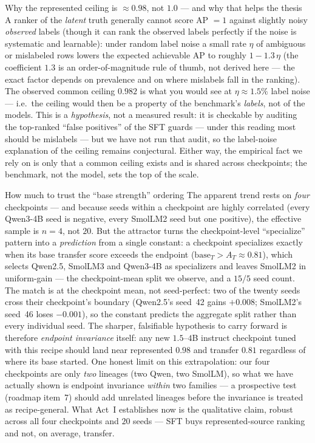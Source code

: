 \begin{background}{Why the represented ceiling is $\approx0.98$, not $1.0$ --- and why that helps the thesis}
A ranker of the \emph{latent} truth generally cannot score AP $=1$ against slightly noisy \emph{observed}
labels (though it can rank the observed labels perfectly if the noise is systematic and learnable): under
random label noise a small rate $\eta$ of ambiguous or mislabeled rows lowers the expected achievable AP to
roughly $1-1.3\,\eta$ (the coefficient
$1.3$ is an order-of-magnitude rule of thumb, not derived here --- the exact factor depends on prevalence
and on where mislabels fall in the ranking). The observed common
ceiling $0.982$ is what you would see at $\eta\approx1.5\%$ label noise --- i.e.\ the ceiling would then be a
property of the benchmark's \emph{labels}, not of the models. This is a \emph{hypothesis}, not a measured
result: it is checkable by auditing the top-ranked ``false positives'' of the SFT guards --- under this
reading most should be mislabels --- but we have not run that audit, so the label-noise explanation of the
ceiling remains conjectural. Either way, the empirical fact we rely on is only that a common ceiling exists
and is shared across checkpoints; the benchmark, not the model, sets the top of the scale.
\end{background}

\begin{takeaway}{How much to trust the ``base strength'' ordering}
The apparent trend rests on \emph{four} checkpoints --- and because seeds within a checkpoint are highly
correlated (every Qwen3-4B seed is negative, every SmolLM2 seed but one positive), the effective sample is
$n=4$, not $20$. But the attractor turns the checkpoint-level ``specialize'' pattern into a \emph{prediction} from a
single constant: a checkpoint specializes exactly when its base transfer score exceeds the endpoint
($\text{base}_T>A_T\approx0.81$), which selects Qwen2.5, SmolLM3 and Qwen3-4B as specializers and leaves
SmolLM2 in uniform-gain --- the checkpoint-mean split we observe, and a $15/5$ seed count. The match is at
the checkpoint mean, not seed-perfect: two of the twenty seeds cross their checkpoint's boundary (Qwen2.5's
seed~42 gains $+0.008$; SmolLM2's seed~46 loses $-0.001$), so the constant predicts the aggregate split
rather than every individual seed. The sharper, falsifiable hypothesis to carry forward is
therefore \emph{endpoint invariance} itself: any new $1.5$--$4$B instruct checkpoint tuned with this recipe
should land near represented $0.98$ and transfer $0.81$ regardless of where its base started. One honest
limit on this extrapolation: our four checkpoints are only \emph{two} lineages (two Qwen, two SmolLM), so
what we have actually shown is endpoint invariance \emph{within} two families --- a prospective test
(roadmap item~7) should add unrelated lineages before the invariance is treated as recipe-general. What
Act~I establishes now is the qualitative claim, robust across all four checkpoints and $20$ seeds --- SFT
buys represented-source ranking and not, on average, transfer.
\end{takeaway}


